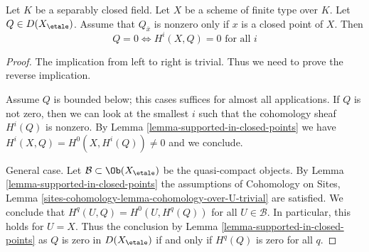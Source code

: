 \begin{lemma}
\label{lemma-vanishing-closed-points}
Let $K$ be a separably closed field. Let $X$ be a scheme of finite
type over $K$. Let $Q \in D(X_\etale)$. Assume that $Q_{\overline{x}}$
is nonzero only if $x$ is a closed point of $X$. Then
$$
Q = 0 \Leftrightarrow H^i(X, Q) = 0 \text{ for all }i
$$
\end{lemma}

\begin{proof}
The implication from left to right is trivial. Thus we need
to prove the reverse implication.

\medskip\noindent
Assume $Q$ is bounded below; this cases suffices for almost all
applications. If $Q$ is not zero, then we can look at the smallest $i$
such that the cohomology sheaf $H^i(Q)$ is nonzero.
By Lemma \ref{lemma-supported-in-closed-points} we have
$H^i(X, Q) = H^0(X, H^i(Q)) \not = 0$ and we conclude.

\medskip\noindent
General case. Let $\mathcal{B} \subset \Ob(X_\etale)$ be the
quasi-compact objects. By Lemma \ref{lemma-supported-in-closed-points}
the assumptions of Cohomology on Sites, Lemma
\ref{sites-cohomology-lemma-cohomology-over-U-trivial}
are satisfied. We conclude that $H^q(U, Q) = H^0(U, H^q(Q))$
for all $U \in \mathcal{B}$. In particular, this holds for $U = X$.
Thus the conclusion by Lemma \ref{lemma-supported-in-closed-points}
as $Q$ is zero in $D(X_\etale)$ if and only if $H^q(Q)$ is zero
for all $q$.
\end{proof}
